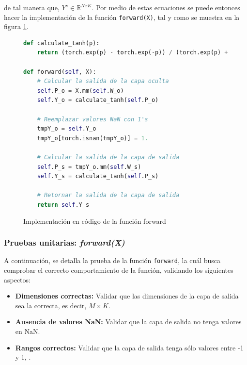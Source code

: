\documentclass{article}
\begin{document}
\noindent
de tal manera que, $Y^s \in \mathbb{R}^{NxK}$. Por medio de estas ecuaciones se puede entonces hacer la implementación de la función \texttt{forward(X)}, tal y como se muestra en la figura \ref{code:fwd}.


\begin{figure}[htbp]
\begin{lstlisting}[language=Python, texcl=true]
def calculate_tanh(p):
    return (torch.exp(p) - torch.exp(-p)) / (torch.exp(p) + torch.exp(-p))

def forward(self, X):
    # Calcular la salida de la capa oculta
    self.P_o = X.mm(self.W_o)
    self.Y_o = calculate_tanh(self.P_o)

    # Reemplazar valores NaN con 1's
    tmpY_o = self.Y_o
    tmpY_o[torch.isnan(tmpY_o)] = 1.

    # Calcular la salida de la capa de salida
    self.P_s = tmpY_o.mm(self.W_s)
    self.Y_s = calculate_tanh(self.P_s)

    # Retornar la salida de la capa de salida
    return self.Y_s
\end{lstlisting}
    \caption{Implementación en código de la función forward}
    \label{code:fwd}
\end{figure}
    

\subsubsection{Pruebas unitarias: \textit{forward(X)}}

A continuación, se detalla la prueba de la función \texttt{forward}, la cuál busca comprobar el correcto comportamiento de la función, validando los siguientes aspectos:

\begin{itemize}
    \item \textbf{Dimensiones correctas:} Validar que las dimensiones de la capa de salida sea la correcta, es decir, $M \times K$.

    \item \textbf{Ausencia de valores NaN:} Validar que la capa de salida no tenga valores en NaN.
    
    \item \textbf{Rangos correctos:} Validar que la capa de salida tenga sólo valores entre -1 y 1, . \\
\end{itemize}
\end{document}
